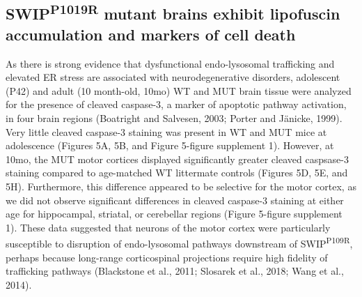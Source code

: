\subsection{SWIP\textsuperscript{P1019R} mutant brains exhibit 
lipofuscin accumulation and markers of cell death}

As there is strong evidence that dysfunctional endo-lysosomal trafficking 
and elevated ER stress are associated with neurodegenerative disorders, 
adolescent (P42) and adult (10 month-old, 10mo) WT and MUT brain tissue 
were analyzed for the presence of cleaved caspase-3, a marker of apoptotic 
pathway activation, in four brain regions (Boatright and Salvesen, 2003; 
Porter and Jänicke, 1999). Very little cleaved caspase-3
staining was present in WT and MUT mice at adolescence (Figures 5A, 5B, and
Figure 5-figure supplement 1). However, at 10mo, the MUT motor cortices
displayed significantly greater cleaved caspsase-3 staining compared to
age-matched WT littermate controls (Figures 5D, 5E, and 5H). Furthermore, this
difference appeared to be selective for the motor cortex, as we did not observe
significant differences in cleaved caspase-3 staining at either age for
hippocampal, striatal, or cerebellar regions (Figure 5-figure supplement 1).
These data suggested that neurons of the motor cortex were particularly
susceptible to disruption of endo-lysosomal pathways downstream of SWIP\textsuperscript{P109R},
perhaps because long-range corticospinal projections require high fidelity of
trafficking pathways (Blackstone et al., 2011; Slosarek et al., 2018; Wang et
al., 2014). 

